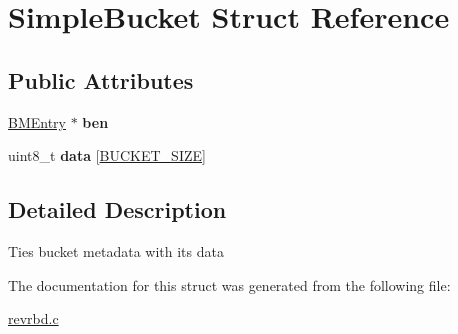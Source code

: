 \hypertarget{structSimpleBucket}{\section{\-Simple\-Bucket \-Struct \-Reference}
\label{structSimpleBucket}
}
\subsection*{\-Public \-Attributes}
\begin{DoxyCompactItemize}
\item 
\hypertarget{structSimpleBucket_af2ee86011845ad537257ad7b41d95501}{\hyperlink{structBMEntry}{\-B\-M\-Entry} $\ast$ {\bfseries ben}}\label{structSimpleBucket_af2ee86011845ad537257ad7b41d95501}

\item 
\hypertarget{structSimpleBucket_a9d282ae18de236b92a6cc0df521db279}{uint8\-\_\-t {\bfseries data} \mbox{[}\hyperlink{revdedup_8h_a352964ca100791f7e6438323f55b8541}{\-B\-U\-C\-K\-E\-T\-\_\-\-S\-I\-Z\-E}\mbox{]}}\label{structSimpleBucket_a9d282ae18de236b92a6cc0df521db279}

\end{DoxyCompactItemize}


\subsection{\-Detailed \-Description}
\-Ties bucket metadata with its data 

\-The documentation for this struct was generated from the following file\-:\begin{DoxyCompactItemize}
\item 
\hyperlink{revrbd_8c}{revrbd.\-c}\end{DoxyCompactItemize}
